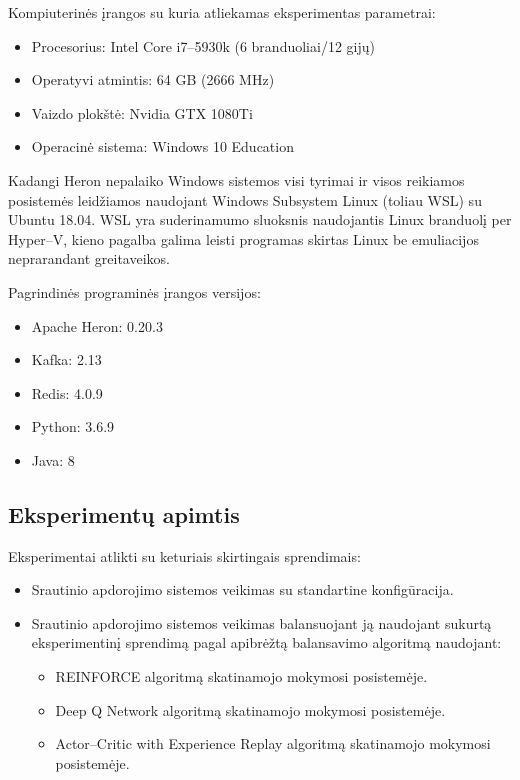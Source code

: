 \documentclass{VUMIFPSbakalaurinis}
\begin{document}
Kompiuterinės įrangos su kuria atliekamas eksperimentas parametrai:
\begin{itemize}
    \item Procesorius: Intel Core i7–5930k (6 branduoliai/12 gijų)
    \item Operatyvi atmintis: 64 GB (2666 MHz)
    \item Vaizdo plokštė: Nvidia GTX 1080Ti
    \item Operacinė sistema: Windows 10 Education
\end{itemize}

Kadangi Heron nepalaiko Windows sistemos visi tyrimai ir visos reikiamos posistemės leidžiamos naudojant Windows Subsystem Linux (toliau WSL) su Ubuntu 18.04. WSL yra suderinamumo sluoksnis naudojantis Linux branduolį per Hyper–V, kieno pagalba galima leisti programas skirtas Linux be emuliacijos neprarandant greitaveikos.

Pagrindinės programinės įrangos versijos:
\begin{itemize}
    \item Apache Heron: 0.20.3
    \item Kafka: 2.13
    \item Redis: 4.0.9
    \item Python: 3.6.9
    \item Java: 8
\end{itemize}
\subsection{Eksperimentų apimtis}

Eksperimentai atlikti su keturiais skirtingais sprendimais:
\begin{itemize}
    \item Srautinio apdorojimo sistemos veikimas su standartine konfigūracija.
    \item Srautinio apdorojimo sistemos veikimas balansuojant ją naudojant sukurtą eksperimentinį sprendimą pagal apibrėžtą balansavimo algoritmą naudojant:
    \begin{itemize}
        \item REINFORCE algoritmą skatinamojo mokymosi posistemėje.
        \item Deep Q Network algoritmą skatinamojo mokymosi posistemėje.
        \item Actor–Critic with Experience Replay algoritmą skatinamojo mokymosi posistemėje.
    \end{itemize}
\end{itemize}
\end{document}
